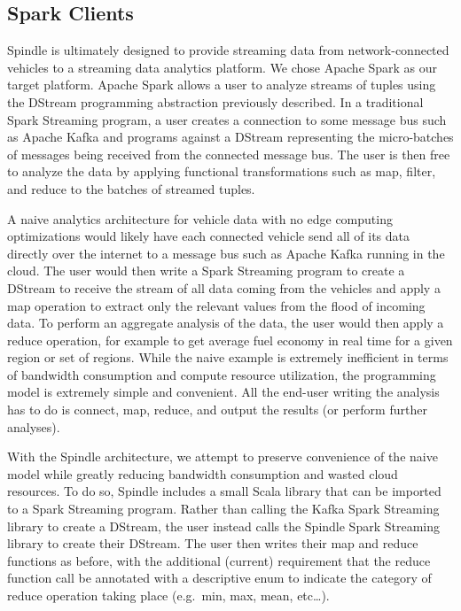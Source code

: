 \documentclass{thesis}
\begin{document}
\subsection{Spark Clients}
    Spindle is ultimately designed to provide streaming data from network-connected vehicles to a streaming data
    analytics platform. We chose Apache Spark as our target platform. Apache Spark allows a user to analyze
    streams of tuples using the DStream programming abstraction previously described. In a traditional Spark
    Streaming program, a user creates a connection to some message bus such as Apache Kafka and programs against
    a DStream representing the micro-batches of messages being received from the connected message bus. The user
    is then free to analyze the data by applying functional transformations such as map, filter, and reduce
    to the batches of streamed tuples. 
    
    A naive analytics architecture for vehicle data with no edge computing optimizations
    would likely have each connected vehicle send all of its data directly over the internet to a message bus such as
    Apache Kafka running in the cloud. The user would then write a Spark Streaming program to create a DStream
    to receive the stream of all data coming from the vehicles and apply a map operation to extract only the 
    relevant values from the flood of incoming data. To perform an aggregate analysis of the data, the user would then
    apply a reduce operation, for example to get average fuel economy in real time for a given region or set of
    regions. While the naive example is extremely inefficient in terms of bandwidth consumption and compute resource
    utilization, the programming model is extremely simple and convenient. All the end-user writing the analysis
    has to do is connect, map, reduce, and output the results (or perform further analyses). 

    With the Spindle architecture, we attempt to preserve convenience of the naive model while greatly reducing
    bandwidth consumption and wasted cloud resources. To do so, Spindle includes a small Scala library that can be
    imported to a Spark Streaming program. Rather than calling the Kafka Spark Streaming library to create a 
    DStream, the user instead calls the Spindle Spark Streaming library to create their DStream. The user then
    writes their map and reduce functions as before, with the additional (current) requirement that the reduce function
    call be annotated with a descriptive enum to indicate the category of reduce operation taking place (e.g.\ min,
    max, mean, etc\dots).%
\end{document}
